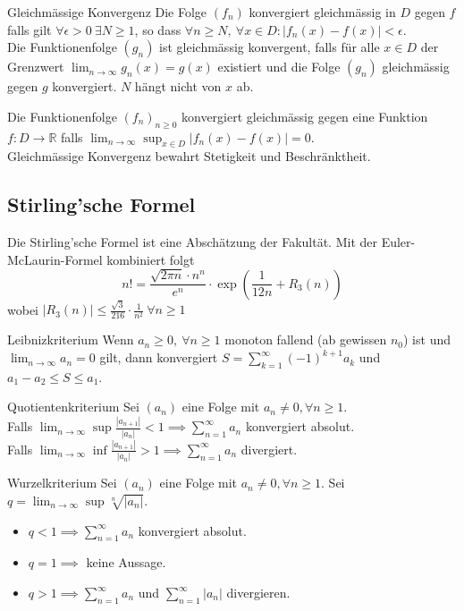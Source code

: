 \documentclass[a4paper,10pt]{article}
\def\limn{\lim_{n\to \infty}}
\def\sumk{\sum_{k=1}^\infty}
\begin{document}
 \begin{mainbox}{Gleichmässige Konvergenz}
  Die Folge $(f_n)$ konvergiert gleichmässig in $D$ gegen $f$ falls gilt $\forall \epsilon > 0 \ \exists N \ge 1$, so dass $\forall n \ge N, \ \forall x \in D: | f_n(x) - f(x) | < \epsilon$. \\
  Die Funktionenfolge $(g_n)$ ist gleichmässig konvergent, falls für alle $x\in D$ der Grenzwert $\limn g_n(x) = g(x)$ existiert und die Folge $(g_n)$ gleichmässig gegen $g$ konvergiert. $N$ hängt nicht von $x$ ab.
 \end{mainbox}
 
 Die Funktionenfolge $(f_n)_{n \geq 0}$ konvergiert gleichmässig gegen eine Funktion $f: D \rightarrow \mathbb{R}$ falls $\lim_{n \rightarrow \infty} \sup_{x \in D} |f_n(x) - f(x)| = 0$.\\
 
 Gleichmässige Konvergenz bewahrt Stetigkeit und Beschränktheit.
 
\subsection{Stirling'sche Formel}
Die Stirling'sche Formel ist eine Abschätzung der Fakultät. Mit der Euler-McLaurin-Formel kombiniert folgt
$$n! = \frac{\sqrt{2\pi n} \cdot n^n}{e^n} \cdot \exp(\frac{1}{12n}+R_3(n))$$
wobei $|R_3(n)| \le \frac{\sqrt{3}}{216}\cdot\frac{1}{n^2} \ \forall n \ge 1$

\begin{subbox}{Leibnizkriterium}
  Wenn $a_n \ge 0, \ \forall n \ge 1$ monoton fallend (ab gewissen $n_0$) ist und $\limn a_n = 0$ gilt, dann konvergiert $S = \sumk (-1)^{k+1} a_k$ und $a_1 - a_2 \le S \le a_1$.
  \end{subbox}
  
  \begin{mainbox}{Quotientenkriterium}
  Sei $(a_n)$ eine Folge mit $a_n \ne 0, \forall n \ge 1$. \\ Falls $\limn \sup \frac{|a_{n+1}|}{|a_n|} < 1 \implies \sum_{n=1}^\infty a_n$ konvergiert absolut. \\Falls $\limn \inf \frac{|a_{n+1}|}{|a_n|} > 1 \implies \sum_{n=1}^\infty a_n$ divergiert.  
  \end{mainbox}
  
  \begin{mainbox}{Wurzelkriterium}
  Sei $(a_n)$ eine Folge mit $a_n \ne 0, \forall n \ge 1$. Sei $q = \limn \sup \sqrt[n]{|a_n|}$. 
  \begin{itemize}
   \item $q < 1 \implies \sum_{n=1}^\infty a_n$ konvergiert absolut.
   \item $q = 1 \implies$ keine Aussage.
   \item $q > 1 \implies \sum_{n=1}^\infty a_n$ und $\sum_{n=1}^\infty |a_n|$ divergieren.
  \end{itemize}
\end{mainbox}
\end{document}
